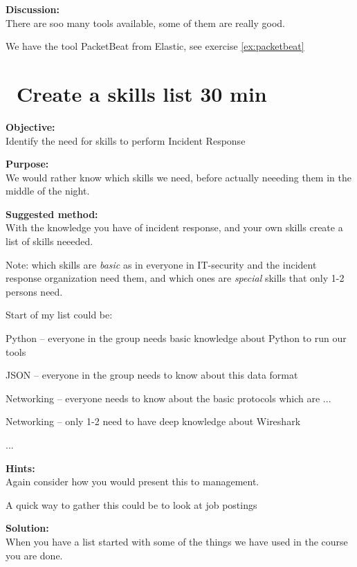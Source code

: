 \documentclass[a4paper,11pt,notitlepage]{report}
\begin{document}
{\bf Discussion:}\\
There are soo many tools available, some of them are really good.

We have the tool PacketBeat from Elastic, see exercise \ref{ex:packetbeat}


\chapter{\faExclamationTriangle\ Create a skills list 30 min}
\label{ex:skills-list}



{\bf Objective:}\\
Identify the need for skills to perform Incident Response


{\bf Purpose:}\\
We would rather know which skills we need, before actually neeeding them in the middle of the night.

{\bf Suggested method:}\\
With the knowledge you have of incident response, and your own skills create a list of skills neeeded.

Note: which skills are \emph{basic} as in everyone in IT-security and the incident response organization need them, and which ones are \emph{special} skills that only 1-2 persons need.

Start of my list could be:
\begin{list2}
\item Python -- everyone in the group needs basic knowledge about Python to run our tools
\item JSON -- everyone in the group needs to know about this data format
\item Networking -- everyone needs to know about the basic protocols which are ...
\item Networking -- only 1-2 need to have deep knowledge about Wireshark
\item ...
\end{list2}

{\bf Hints:}\\
Again consider how you would present this to management.

A quick way to gather this could be to look at job postings

{\bf Solution:}\\
When you have a list started with some of the things we have used in the course you are done.
\end{document}
